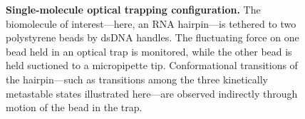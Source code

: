 \documentclass[aps,pre,twocolumn,superscriptaddress,nofootinbib,longbibliography]{revtex4-1}
\begin{document}
{\begin{figure}[tbp]
\noindent
{}
\caption{{\bf Single-molecule optical trapping configuration.}
The biomolecule of interest---here, %
{\color{red} an} RNA hairpin---is tethered to two polystyrene beads by dsDNA handles.
The fluctuating force on one bead held in an optical trap is monitored, while the other bead is held suctioned to a micropipette tip.
Conformational transitions of the hairpin---such as transitions among the three kinetically metastable states illustrated here---are observed indirectly through motion of the bead in the trap.
\label{figure:trap-configuration}}
\end{figure}

}
\end{document}
